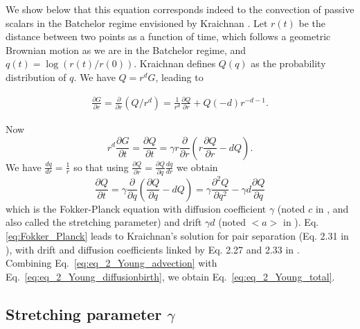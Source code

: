 We show below that this equation corresponds indeed to the convection of passive scalars in the Batchelor regime envisioned by Kraichnan \cite{kraichnan_convection_1974}. Let $r(t)$ be the distance between two points as a function of time, which follows a geometric Brownian motion as we are in the Batchelor regime, and $q(t)=\log(r(t)/r(0))$.
Kraichnan defines $Q(q)$ as the probability distribution of $q$. We have $Q=r^{d}G$, leading to

\begin{equation}
    \begin{split}
        \frac{\partial G}{\partial r} = \frac{\partial}{\partial r} \left( Q/r^d \right) =
        \frac{1}{r^d}\frac{\partial Q}{\partial r} + Q (-d)r^{-d-1}.
    \end{split}
\end{equation}

Now 
\begin{equation}
    r^d \frac{\partial G}{\partial t} = 
    \frac{\partial Q}{\partial t} = 
    \gamma r \frac{\partial}{\partial r} \left( r  \frac{\partial Q}{\partial r} - dQ\right).
\end{equation}
We have $\frac{dq}{dr} = \frac{1}{r}$ so that using $\frac{\partial Q}{\partial r} = \frac{\partial Q}{\partial q} \frac{dq}{dr}$ we obtain 
\begin{equation}
    \frac{\partial Q}{\partial t} = \gamma \frac{\partial}{\partial q} \left( \frac{\partial Q}{\partial q} - dQ\right)  = 
    \gamma \frac{\partial^2 Q}{\partial q^2} - \gamma d \frac{\partial Q}{\partial q} \label{eq:Fokker_Planck}
\end{equation}
which is the Fokker-Planck equation with diffusion coefficient $\gamma$ (noted $c$ in \cite{kraichnan_convection_1974}, and also called the stretching parameter) and drift $\gamma d$ (noted $<a>$ in \cite{kraichnan_convection_1974}). Eq. \ref{eq:Fokker_Planck} leads to Kraichnan's solution for pair separation (Eq. 2.31 in \cite{kraichnan_convection_1974}), with drift and diffusion coefficients linked by Eq. 2.27 and 2.33 in \cite{kraichnan_convection_1974}.  \\

Combining Eq.~\ref{eq:eq_2_Young_advection} with Eq.~\ref{eq:eq_2_Young_diffusionbirth}, we obtain Eq.~\ref{eq:eq_2_Young_total}. 

\subsection*{Stretching parameter $\gamma$}

